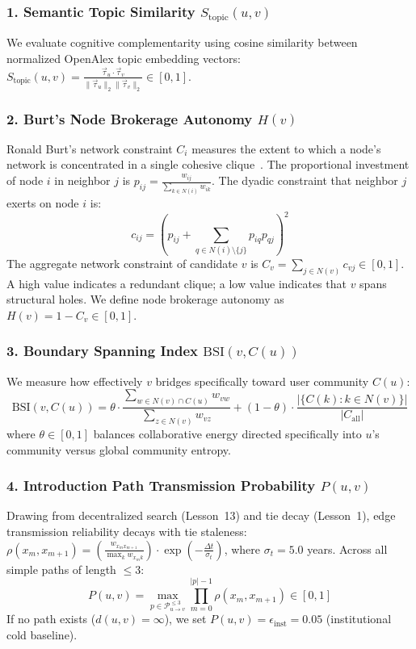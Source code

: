 \subsubsection{1. Semantic Topic Similarity $S_{\text{topic}}(u, v)$}
We evaluate cognitive complementarity using cosine similarity between normalized OpenAlex topic embedding vectors: $S_{\text{topic}}(u, v) = \frac{\vec{\tau}_u \cdot \vec{\tau}_v}{\|\vec{\tau}_u\|_2 \|\vec{\tau}_v\|_2} \in [0, 1]$.

\subsubsection{2. Burt's Node Brokerage Autonomy $H(v)$}
Ronald Burt's network constraint $C_i$ measures the extent to which a node's network is concentrated in a single cohesive clique~\cite{burt1992}. The proportional investment of node $i$ in neighbor $j$ is $p_{ij} = \frac{w_{ij}}{\sum_{k \in N(i)} w_{ik}}$. The dyadic constraint that neighbor $j$ exerts on node $i$ is:
\begin{equation}
    c_{ij} = \left( p_{ij} + \sum_{q \in N(i) \setminus \{j\}} p_{iq} p_{qj} \right)^2
\end{equation}
The aggregate network constraint of candidate $v$ is $C_v = \sum_{j \in N(v)} c_{vj} \in [0, 1]$. A high value indicates a redundant clique; a low value indicates that $v$ spans structural holes. We define node brokerage autonomy as $H(v) = 1 - C_v \in [0, 1]$.

\subsubsection{3. Boundary Spanning Index $\text{BSI}(v, C(u))$}
We measure how effectively $v$ bridges specifically toward user community $C(u)$:
\begin{equation}
    \text{BSI}(v, C(u)) = \theta \cdot \frac{\sum_{w \in N(v) \cap C(u)} w_{vw}}{\sum_{z \in N(v)} w_{vz}} + (1 - \theta) \cdot \frac{|\{C(k) : k \in N(v)\}|}{|C_{\text{all}}|}
\end{equation}
where $\theta \in [0, 1]$ balances collaborative energy directed specifically into $u$'s community versus global community entropy.

\subsubsection{4. Introduction Path Transmission Probability $P(u, v)$}
Drawing from decentralized search (Lesson~13) and tie decay (Lesson~1), edge transmission reliability decays with tie staleness: $\rho(x_m, x_{m+1}) = \left( \frac{w_{x_m x_{m+1}}}{\max_{k} w_{x_m k}} \right) \cdot \exp\left( -\frac{\Delta t}{\sigma_t} \right)$, where $\sigma_t = 5.0$ years. Across all simple paths of length $\le 3$:
\begin{equation}
    P(u, v) = \max_{p \in \mathcal{P}_{u \to v}^{\le 3}} \prod_{m=0}^{|p|-1} \rho(x_m, x_{m+1}) \in [0, 1]
\end{equation}
If no path exists ($d(u, v) = \infty$), we set $P(u, v) = \epsilon_{\text{inst}} = 0.05$ (institutional cold baseline).


